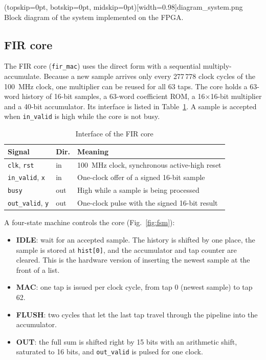 \documentclass{ieeeaccess}
\begin{document}
\Figure[t!](topskip=0pt, botskip=0pt, midskip=0pt)[width=0.98\columnwidth]{diagram_system.png}
{Block diagram of the system implemented on the FPGA.\label{fig:system}}

\subsection{FIR core}
The FIR core (\texttt{fir\_mac}) uses the direct form with a sequential multiply-accumulate. Because a new sample arrives only every 277\,778 clock cycles of the 100~MHz clock, one multiplier can be reused for all 63 taps. The core holds a 63-word history of 16-bit samples, a 63-word coefficient ROM, a 16$\times$16-bit multiplier and a 40-bit accumulator. Its interface is listed in Table~\ref{tab:if}. A sample is accepted when \texttt{in\_valid} is high while the core is not busy.

\begin{table}[!t]
\caption{Interface of the FIR core}
\label{tab:if}
\centering
\begin{tabular}{lll}
\toprule
Signal & Dir. & Meaning \\
\midrule
\texttt{clk}, \texttt{rst} & in & 100~MHz clock, synchronous active-high reset \\
\texttt{in\_valid}, \texttt{x} & in & One-clock offer of a signed 16-bit sample \\
\texttt{busy} & out & High while a sample is being processed \\
\texttt{out\_valid}, \texttt{y} & out & One-clock pulse with the signed 16-bit result \\
\bottomrule
\end{tabular}
\end{table}

A four-state machine controls the core (Fig.~\ref{fig:fsm}):
\begin{itemize}
\item \textbf{IDLE}: wait for an accepted sample. The history is shifted by one place, the sample is stored at \texttt{hist[0]}, and the accumulator and tap counter are cleared. This is the hardware version of inserting the newest sample at the front of a list.
\item \textbf{MAC}: one tap is issued per clock cycle, from tap 0 (newest sample) to tap 62.
\item \textbf{FLUSH}: two cycles that let the last tap travel through the pipeline into the accumulator.
\item \textbf{OUT}: the full sum is shifted right by 15 bits with an arithmetic shift, saturated to 16 bits, and \texttt{out\_valid} is pulsed for one clock.
\end{itemize}
\end{document}
